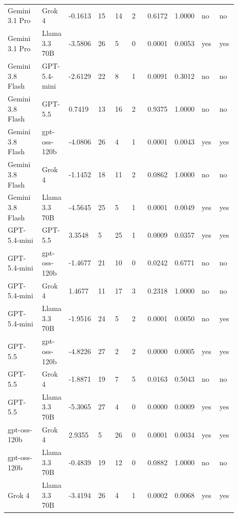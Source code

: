 \begin{landscape}
\begin{longtable}{p{0.162\linewidth}p{0.081\linewidth}p{0.081\linewidth}p{0.081\linewidth}p{0.081\linewidth}p{0.081\linewidth}p{0.081\linewidth}p{0.081\linewidth}p{0.081\linewidth}p{0.081\linewidth}}
Gemini 3.1 Pro & Grok 4 & -0.1613 & 15 & 14 & 2 & 0.6172 & 1.0000 & no & no \\
Gemini 3.1 Pro & Llama 3.3 70B & -3.5806 & 26 & 5 & 0 & 0.0001 & 0.0053 & yes & yes \\
Gemini 3.8 Flash & GPT-5.4-mini & -2.6129 & 22 & 8 & 1 & 0.0091 & 0.3012 & no & no \\
Gemini 3.8 Flash & GPT-5.5 & 0.7419 & 13 & 16 & 2 & 0.9375 & 1.0000 & no & no \\
Gemini 3.8 Flash & gpt-oss-120b & -4.0806 & 26 & 4 & 1 & 0.0001 & 0.0043 & yes & yes \\
Gemini 3.8 Flash & Grok 4 & -1.1452 & 18 & 11 & 2 & 0.0862 & 1.0000 & no & no \\
Gemini 3.8 Flash & Llama 3.3 70B & -4.5645 & 25 & 5 & 1 & 0.0001 & 0.0049 & yes & yes \\
GPT-5.4-mini & GPT-5.5 & 3.3548 & 5 & 25 & 1 & 0.0009 & 0.0357 & yes & yes \\
GPT-5.4-mini & gpt-oss-120b & -1.4677 & 21 & 10 & 0 & 0.0242 & 0.6771 & no & no \\
GPT-5.4-mini & Grok 4 & 1.4677 & 11 & 17 & 3 & 0.2318 & 1.0000 & no & no \\
GPT-5.4-mini & Llama 3.3 70B & -1.9516 & 24 & 5 & 2 & 0.0001 & 0.0050 & no & yes \\
GPT-5.5 & gpt-oss-120b & -4.8226 & 27 & 2 & 2 & 0.0000 & 0.0005 & yes & yes \\
GPT-5.5 & Grok 4 & -1.8871 & 19 & 7 & 5 & 0.0163 & 0.5043 & no & no \\
GPT-5.5 & Llama 3.3 70B & -5.3065 & 27 & 4 & 0 & 0.0000 & 0.0009 & yes & yes \\
gpt-oss-120b & Grok 4 & 2.9355 & 5 & 26 & 0 & 0.0001 & 0.0034 & yes & yes \\
gpt-oss-120b & Llama 3.3 70B & -0.4839 & 19 & 12 & 0 & 0.0882 & 1.0000 & no & no \\
Grok 4 & Llama 3.3 70B & -3.4194 & 26 & 4 & 1 & 0.0002 & 0.0068 & yes & yes \\
\bottomrule
\end{longtable}
\normalsize
\end{landscape}
